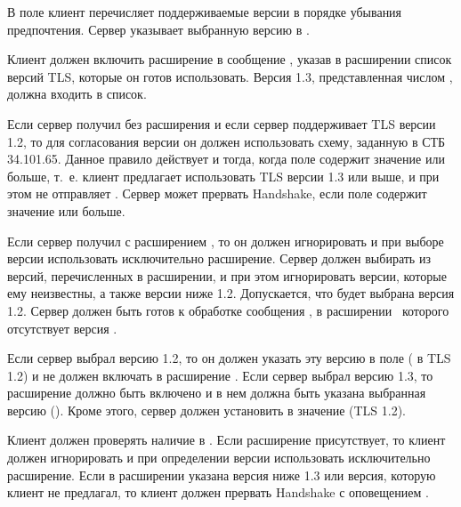 В поле  клиент перечисляет поддерживаемые версии в порядке 
убывания предпочтения. Сервер указывает выбранную версию в 
.

Клиент должен включить расширение  в сообщение 
, указав в расширении список версий TLS, которые он 
готов использовать. Версия 1.3, представленная числом , должна 
входить в список.

Если сервер получил  без расширения 
 и если сервер поддерживает TLS версии 1.2, то 
для согласования версии он должен использовать схему, заданную в СТБ 34.101.65. 
%
Данное правило действует и тогда, когда поле  
содержит значение  или больше, т.~е. клиент предлагает 
использовать TLS версии 1.3 или выше, и при этом не отправляет 
.
%
Сервер может прервать Handshake, если поле  
содержит значение  или больше.

Если сервер получил  с расширением
, то он должен игнорировать
 и при выборе версии использовать 
исключительно расширение. Сервер должен выбирать из версий, перечисленных в 
расширении, и при этом игнорировать версии, которые ему неизвестны,
а также версии ниже 1.2.
%
%
Допускается, что будет выбрана версия 1.2.
%
Сервер должен быть готов к обработке сообщения , в 
расширении~ которого отсутствует версия . 

Если сервер выбрал версию 1.2, то он должен указать эту версию в поле 
 ( в TLS 1.2) 
и не должен включать в  расширение 
.
%
%
Если сервер выбрал версию 1.3, то расширение должно быть включено и в нем 
должна быть указана выбранная версию (). Кроме этого, сервер 
должен установить в  значение  
(TLS 1.2).

Клиент должен проверять наличие  в 
. Если расширение присутствует, то клиент должен 
игнорировать  и при определении версии 
использовать исключительно расширение. Если в расширении указана версия ниже 
1.3 или версия, которую клиент не предлагал, то клиент должен прервать 
Handshake с оповещением .

